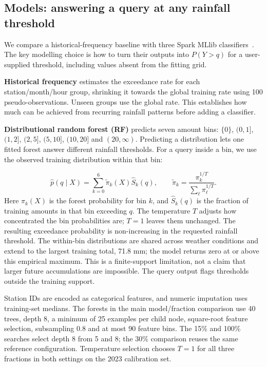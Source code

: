 \documentclass[11pt,a4paper]{article}
\begin{document}
\subsection{Models: answering a query at any rainfall threshold}
We compare a historical-frequency baseline with three Spark MLlib classifiers~\cite{sparkml}. The key modelling choice is how to turn their outputs into $P(Y>q)$ for a user-supplied threshold, including values absent from the fitting grid.

\textbf{Historical frequency} estimates the exceedance rate for each station/month/hour group, shrinking it towards the global training rate using 100 pseudo-observations. Unseen groups use the global rate. This establishes how much can be achieved from recurring rainfall patterns before adding a classifier.

\textbf{Distributional random forest (RF)} predicts seven amount bins: $\{0\}$, $(0,1]$, $(1,2]$, $(2,5]$, $(5,10]$, $(10,20]$ and $(20,\infty)$. Predicting a distribution lets one fitted forest answer different rainfall thresholds. For a query inside a bin, we use the observed training distribution within that bin:

\[
\widehat p(q\mid X)=\sum_{k=0}^{6}\widetilde\pi_k(X)\widehat S_k(q),
\qquad
\widetilde\pi_k=\frac{\pi_k^{1/T}}{\sum_\ell\pi_\ell^{1/T}}.
\]
Here $\pi_k(X)$ is the forest probability for bin $k$, and $\widehat S_k(q)$ is the fraction of training amounts in that bin exceeding $q$. The temperature $T$ adjusts how concentrated the bin probabilities are; $T=1$ leaves them unchanged. The resulting exceedance probability is non-increasing in the requested rainfall threshold. The within-bin distributions are shared across weather conditions and extend to the largest training total, 71.8 mm; the model returns zero at or above this empirical maximum. This is a finite-support limitation, not a claim that larger future accumulations are impossible. The query output flags thresholds outside the training support.

Station IDs are encoded as categorical features, and numeric imputation uses training-set medians. The forests in the main model/fraction comparison use 40 trees, depth 8, a minimum of 25 examples per child node, square-root feature selection, subsampling 0.8 and at most 90 feature bins. The 15\% and 100\% searches select depth 8 from 5 and 8; the 30\% comparison reuses the same reference configuration. Temperature selection chooses $T=1$ for all three fractions in both settings on the 2023 calibration set.
\end{document}
